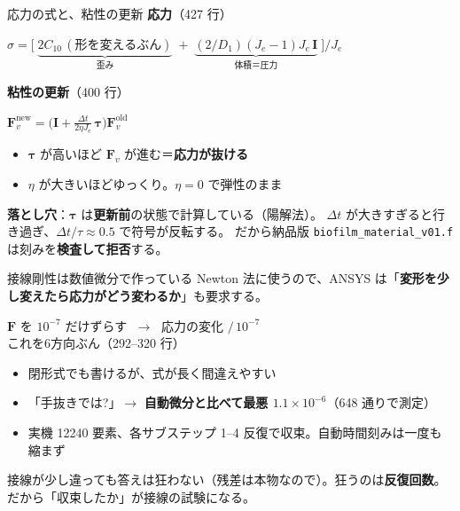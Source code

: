 \documentclass[aspectratio=169,11pt]{beamer}
\begin{document}
\begin{frame}{応力の式と、粘性の更新}
\vspace{2pt}
\textbf{\small 応力}（427 行）
\begin{center}
\colorbox{gray!10}{\parbox{0.84\linewidth}{\centering\small
$\sigma = \bigl[\;\underbrace{2C_{10}\,(\text{形を変えるぶん})}_{\text{歪み}}
\;+\;\underbrace{(2/D_1)(J_e-1)J_e\,\bm{I}}_{\text{体積＝圧力}}\;\bigr] / J_e$}}
\end{center}
\vspace{6pt}
\textbf{\small 粘性の更新}（400 行）
\begin{center}
\colorbox{gray!10}{\parbox{0.84\linewidth}{\centering\small
$\bm{F}_v^{\text{new}} = \bigl(\bm{I} + \tfrac{\Delta t}{2\eta J_e}\,\bm{\tau}\bigr)\bm{F}_v^{\text{old}}$}}
\end{center}
\vspace{4pt}
\begin{itemize}\small
  \item $\bm{\tau}$ が高いほど $\bm{F}_v$ が進む＝\textbf{応力が抜ける}
  \item $\eta$ が大きいほどゆっくり。$\eta=0$ で弾性のまま
\end{itemize}
\vspace{4pt}
\small \textbf{落とし穴}：$\bm{\tau}$ は\textbf{更新前}の状態で計算している（陽解法）。
$\Delta t$ が大きすぎると行き過ぎ、$\Delta t/\tau \approx 0.5$ で符号が反転する。
だから納品版 \texttt{biofilm\_material\_v01.f} は刻みを\textbf{検査して拒否}する。
\end{frame}

\begin{frame}{接線剛性は数値微分で作っている}
\small Newton 法に使うので、ANSYS は「\textbf{変形を少し変えたら応力がどう変わるか}」も要求する。
\vspace{5pt}
\begin{center}
\colorbox{gray!10}{\parbox{0.8\linewidth}{\centering\small
$\bm{F}$ を $10^{-7}$ だけずらす $\;\rightarrow\;$ 応力の変化 $/\,10^{-7}$\\[2pt]
\footnotesize これを6方向ぶん（292--320 行）}}
\end{center}
\vspace{6pt}
\begin{itemize}\small
  \item 閉形式でも書けるが、式が長く間違えやすい
  \item 「手抜きでは?」$\rightarrow$ \textbf{自動微分と比べて最悪 $1.1\times10^{-6}$}（648 通りで測定）
  \item 実機 12240 要素、各サブステップ 1--4 反復で収束。自動時間刻みは一度も縮まず
\end{itemize}
\vspace{4pt}
\small 接線が少し違っても答えは狂わない（残差は本物なので）。狂うのは\textbf{反復回数}。
だから「収束したか」が接線の試験になる。
\end{frame}
\end{document}
